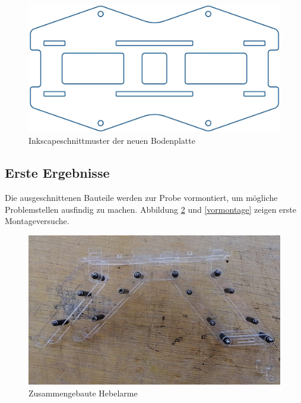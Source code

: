 \begin{figure}[h]
\begin{center}
\includegraphics[scale=0.5]{Grafiken/Inkscapebodenplatte.jpg}
\caption{Inkscapeschnittmuster der neuen Bodenplatte}
\label{inkscape1}
\end{center}
\end{figure}

\subsection{Erste Ergebnisse}
Die ausgeschnittenen Bauteile werden zur Probe vormontiert, um mögliche Problemstellen ausfindig zu machen. Abbildung \ref{hebelarme} und \ref{vormontage} zeigen erste Montageversuche.

\begin{figure}[h]
\begin{center}
\includegraphics[angle=90,scale=0.3]{Grafiken/Fotohebelarme.jpg}
\caption{Zusammengebaute Hebelarme}
\label{hebelarme}
\end{center}
\end{figure}

